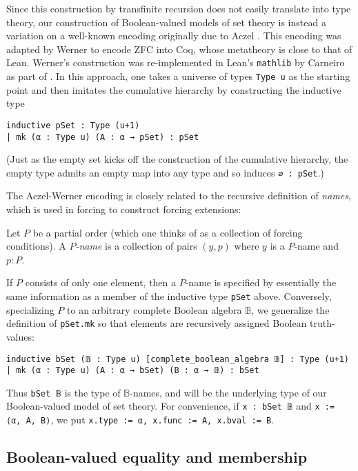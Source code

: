 \documentclass[a4paper,USenglish,cleveref, autoref]{lipics-v2019}
\newcommand{\B}{\mathbb{B}}
\newcommand{\lil}{\lstinline}
\begin{document}
Since this construction by transfinite recursion does not easily translate into type theory, our construction of Boolean-valued models of set theory is instead a variation on a well-known encoding originally due to Aczel \cite{aczel1} \cite{aczel2} \cite{aczel3}. This encoding was adapted by Werner \cite{werner1} to encode ZFC into Coq, whose metatheory is close to that of Lean. Werner's construction was re-implemented in Lean's \texttt{mathlib} by Carneiro as part of \cite{mario1}. In this approach, one takes a universe of types \texttt{Type u} as the starting point and then imitates the cumulative hierarchy by constructing the inductive type
\begin{lstlisting}
inductive pSet : Type (u+1)
| mk (α : Type u) (A : α → pSet) : pSet
\end{lstlisting}
(Just as the empty set kicks off the construction of the cumulative hierarchy, the empty type admits an empty map into any type and so induces \lstinline{∅ : pSet}.)

The Aczel-Werner encoding is closely related to the recursive definition of \emph{names}, which is used in forcing to construct forcing extensions:

\begin{definition}\label{def-p-name}
Let $P$ be a partial order (which one thinks of as a collection of forcing conditions). A \emph{$P$-name} is a collection of pairs $(y, p)$ where $y$ is a $P$-name and $p : P$.
\end{definition}

 If $P$ consists of only one element, then a $P$-name is specified by essentially the same information as a member of the inductive type \lstinline{pSet} above. Conversely, specializing $P$ to an arbitrary complete Boolean algebra $\B$, we generalize the definition of \lstinline{pSet.mk} so that elements are recursively assigned Boolean truth-values:
\begin{lstlisting}
inductive bSet (𝔹 : Type u) [complete_boolean_algebra 𝔹] : Type (u+1)
| mk (α : Type u) (A : α → bSet) (B : α → 𝔹) : bSet
\end{lstlisting}
Thus \lil{bSet 𝔹} is the type of $\B$-names, and will be the underlying type of our Boolean-valued model of set theory. For convenience, if \lstinline{x : bSet 𝔹} and \lstinline{x := ⟨α, A, B⟩}, we put \lstinline{x.type := α, x.func := A, x.bval := B}.

\subsection{Boolean-valued equality and membership}
\end{document}
